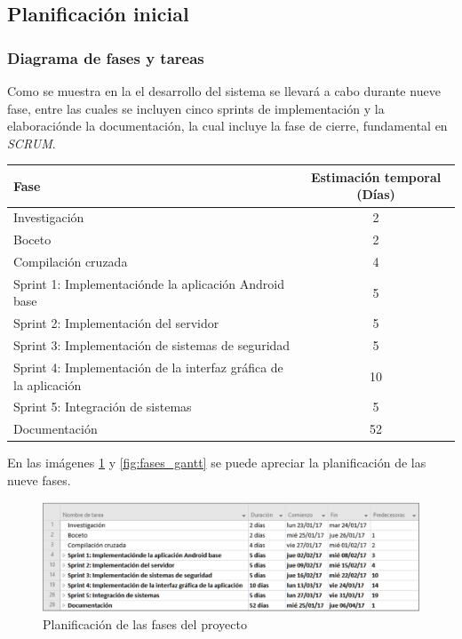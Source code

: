 \documentclass[12pt]{article}
\begin{document}
    \subsection{Planificación inicial}
        \subsubsection{Diagrama de fases y tareas}
        Como se muestra en la  el desarrollo del sistema se llevará a cabo durante nueve fase, entre las cuales se incluyen cinco sprints de implementación y la elaboraciónde la documentación, la cual incluye la fase de cierre, fundamental en \textit{SCRUM}.

        \begin{tabular}{|l|c|}
            \hline
            \textbf{Fase}  & \textbf{Estimación temporal} (Días) \\           
            \hline
            Investigación                                                       &   2    \\
            Boceto                                                              &   2    \\
            Compilación cruzada                                                 &   4    \\
            Sprint 1: Implementaciónde la aplicación Android base               &   5    \\
            Sprint 2: Implementación del servidor                               &   5    \\
            Sprint 3: Implementación de sistemas de seguridad                   &   5    \\
            Sprint 4: Implementación de la interfaz gráfica de la aplicación    &   10   \\
            Sprint 5: Integración de sistemas                                   &   5    \\
            Documentación                                                       &   52   \\
            \hline
        \end{tabular}

        En las imágenes \ref{fig:fases} y \ref{fig:fases_gantt} se puede apreciar la planificación de las nueve fases.

        \begin{figure}[h!]
            \centering
                \includegraphics[scale=0.7]{fases.eps}
                \caption{Planificación de las fases del proyecto}
                \label{fig:fases}
        \end{figure}
\end{document}
